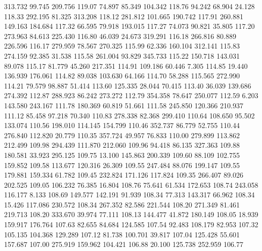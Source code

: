  313.732   99.745  209.756       119.07
  74.897   85.349  104.342       118.76
  94.242   68.904   24.128       118.33
 292.195   81.325  313.208       118.12
 281.812  101.665  190.742       117.91
 260.881  149.163  184.684       117.32
  66.595   79.918  193.015       117.27
  74.073   90.821   35.805       117.20
 273.963   84.613  225.430       116.80
  46.039   24.673  319.291       116.18
 266.816   80.889  226.596       116.17
 279.959   78.567  270.325       115.99
  62.336  160.104  312.141       115.83
 274.159   92.385   31.538       115.58
 261.004   93.829  345.733       115.22
 150.718  143.031   89.078       115.17
  81.779   45.260  217.351       114.91
 109.186   60.446    7.305       114.85
  19.440  136.939  176.061       114.82
  89.038  103.630   64.166       114.70
  58.288  115.565  272.990       114.21
  79.579   98.887   51.414       113.60
 125.335   28.044   70.415       113.40
  36.039  139.686  274.392       112.87
 288.923   86.242  273.272       112.79
 354.358   78.647  250.077       112.59
   6.203  143.580  243.167       111.78
 180.369   60.819   51.661       111.58
 245.850  120.366  210.937       111.12
  85.458   97.218   70.340       110.83
 278.338   82.368  299.410       110.64
 108.650   95.502  133.074       110.56
 198.010  114.145  154.799       110.46
 352.737   86.779   52.755       110.44
 276.840  112.820   20.779       110.35
 357.724   49.957   76.833       110.00
 279.899  113.862  212.499       109.98
 294.439  111.870  212.060       109.96
  94.418   86.135  327.363       109.88
 180.581   33.923  295.125       109.75
  13.100  145.863  200.339       109.60
  88.109  102.755  159.852       109.58
 113.677  120.316   26.309       109.55
 247.484   88.076  199.147       109.55
 179.881  159.334   61.782       109.45
 232.824  171.126  117.824       109.35
 266.407   89.026  202.525       109.05
 106.232   76.385   16.804       108.76
  75.641   61.534  172.653       108.74
 243.058  116.177    8.133       108.69
 149.577  142.191   91.939       108.34
  77.313  143.317   66.962       108.34
  15.426  117.086  230.572       108.34
 267.352   82.586  221.544       108.20
 271.349   81.461  219.713       108.20
 333.670   39.974   77.111       108.13
 144.477   41.872  180.149       108.05
  18.939  159.917  176.764       107.63
  82.655   84.684  124.585       107.54
  92.483  108.179   82.953       107.32
 105.135  104.368  129.289       107.12
  81.738  100.701   39.817       107.04
 125.428   55.601  157.687       107.00
 275.919  159.962  104.421       106.88
  20.100  125.738  252.959       106.77
